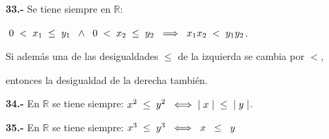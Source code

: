 \documentclass[12pt]{article}
\begin{document}
\textbf{33.-} Se tiene siempre en $\mathbb{R}:$ \vspace{0.2cm}

\hspace{3cm}$\hspace{0.1cm} 0 \hspace{0.1cm} <\hspace{0.1cm}x_1\hspace{0.1cm}\leq\hspace{0.1cm}y_1 \hspace{0.2cm} \wedge\hspace{0.2cm} 0\hspace{0.1cm}<\hspace{0.1cm}x_2\hspace{0.1cm}\leq\hspace{0.1cm}y_2\hspace{0.2cm} \Longrightarrow\hspace{0.2cm} x_1x_2\hspace{0.1cm}<\hspace{0.1cm}y_1y_2$.\vspace{0.1cm} 

Si además una de las desigualdades $\leq$ de la izquierda se cambia por $<$, \par entonces la desigualdad de la derecha también. \vspace{0.2cm}

\textbf{34.-} En $\mathbb{R}$ se tiene siempre: $x^{2} \hspace{0.1cm}\leq \hspace{0.1cm} y^{2}\hspace{0.2cm} \Longleftrightarrow \hspace{0.2cm} \mid x\mid\hspace{0.2cm} \leq\hspace{0.2cm} \mid y\mid$. \vspace{0.2cm}

\textbf{35.-} En $\mathbb{R}$ se tiene siempre: $x^{3} \hspace{0.1cm}\leq \hspace{0.1cm} y^{3}\hspace{0.2cm} \Longleftrightarrow \hspace{0.2cm}  x\hspace{0.2cm} \leq\hspace{0.2cm} y$ \vspace{0.2cm}
\end{document}
